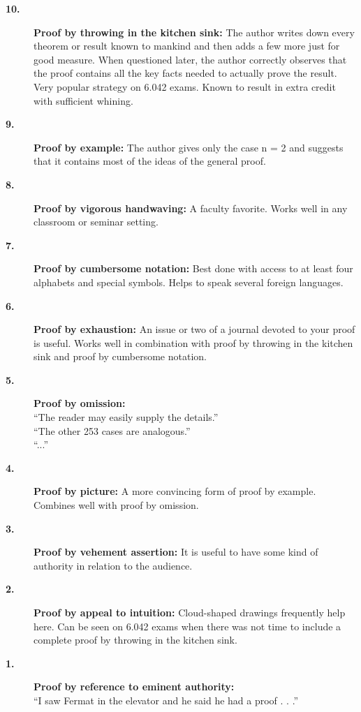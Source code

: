 \documentclass[twoside,12pt]{article}
\begin{document}

\begin{description}
\item[{\bf 10.}]{\bf Proof by throwing in the kitchen sink:} The author writes down
every theorem or result known to mankind and then adds a few more just
for good measure.  When questioned later, the author correctly
observes that the proof contains all the key facts needed to actually
prove the result.  Very popular strategy on 6.042 exams.  Known to
result in extra credit with sufficient whining.
\item[{\bf 9.}]{\bf Proof by example:} The author gives only the case n = 2 and suggests
that it contains most of the ideas of the general proof.
\item[{\bf 8.}]{\bf Proof by vigorous handwaving:} A faculty favorite.  Works well in
any classroom or seminar setting.
\item[{\bf 7.}]{\bf Proof by cumbersome notation:} Best done with access to at least
four alphabets and special symbols.  Helps to speak several foreign
languages.
\item[{\bf 6.}]{\bf Proof by exhaustion:} An issue or two of a journal devoted to your proof is useful.  Works well in combination with proof by throwing in
the kitchen sink and proof by cumbersome notation.
\item[{\bf 5.}]{\bf Proof by omission:} \\
    ``The reader may easily supply the details.'' \\
    ``The other 253 cases are analogous.''\\
    ``...''
\item[{\bf 4.}]{\bf Proof by picture:} A more convincing form of proof by example.
Combines well with proof by omission.
\item[{\bf 3.}]{\bf Proof by vehement assertion:} It is useful to have some kind of authority in relation to the audience.
\item[{\bf 2.}]{\bf Proof by appeal to intuition:} Cloud-shaped drawings frequently help here.  Can be seen on 6.042 exams when there was not time to
include a complete proof by throwing in the kitchen sink.
\item[{\bf 1.}]{\bf Proof by reference to eminent authority:}\\
``I saw Fermat in the elevator and he said he had a proof . . .''
\end{description}
\end{document}
